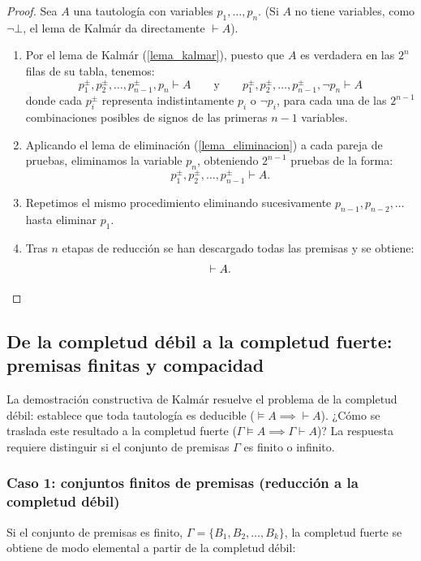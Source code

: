 \begin{proof}
Sea $A$ una tautología con variables $p_1, \dots, p_n$. (Si $A$ no tiene variables, como $\neg\bot$, el lema de Kalmár da directamente $\vdash A$).
\begin{enumerate}
    \item Por el lema de Kalmár (\ref{lema_kalmar}), puesto que $A$ es verdadera en las $2^n$ filas de su tabla, tenemos:
    \[
    p_1^{\pm}, p_2^{\pm}, \dots, p_{n-1}^{\pm}, p_n \vdash A \qquad\text{y}\qquad p_1^{\pm}, p_2^{\pm}, \dots, p_{n-1}^{\pm}, \neg p_n \vdash A
    \]
    donde cada $p_i^{\pm}$ representa indistintamente $p_i$ o $\neg p_i$, para cada una de las $2^{n-1}$ combinaciones posibles de signos de las primeras $n-1$ variables.
    \item Aplicando el lema de eliminación (\ref{lema_eliminacion}) a cada pareja de pruebas, eliminamos la variable $p_n$, obteniendo $2^{n-1}$ pruebas de la forma:
    \[
    p_1^{\pm}, p_2^{\pm}, \dots, p_{n-1}^{\pm} \vdash A.
    \]
    \item Repetimos el mismo procedimiento eliminando sucesivamente $p_{n-1}, p_{n-2}, \dots$ hasta eliminar $p_1$.
    \item Tras $n$ etapas de reducción se han descargado todas las premisas y se obtiene:
    \[
    \vdash A.
    \qedhere
    \]
\end{enumerate}
\end{proof}

\subsection{De la completud débil a la completud fuerte: premisas finitas y compacidad}

La demostración constructiva de Kalmár resuelve el problema de la completud débil: establece que toda tautología es deducible ($\models A \implies \vdash A$). ¿Cómo se traslada este resultado a la completud fuerte ($\Gamma \models A \implies \Gamma \vdash A$)? La respuesta requiere distinguir si el conjunto de premisas $\Gamma$ es finito o infinito.

\subsubsection{Caso 1: conjuntos finitos de premisas (reducción a la completud débil)}

Si el conjunto de premisas es finito, $\Gamma = \{B_1, B_2, \dots, B_k\}$, la completud fuerte se obtiene de modo elemental a partir de la completud débil:

